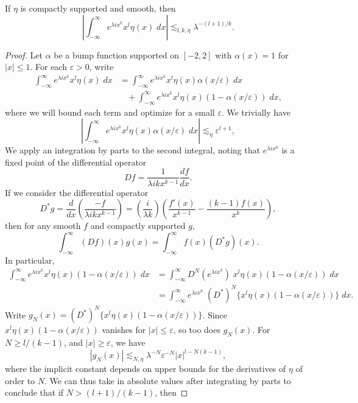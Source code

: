 \begin{lemma}
  If $\eta$ is compactly supported and smooth, then
  \[ \left| \int_{-\infty}^\infty e^{\lambda i x^k} x^l \eta(x)\; dx \right| \lesssim_{l,k,\eta} \lambda^{-(l + 1)/k}. \]
\end{lemma}
\begin{proof}
  Let $\alpha$ be a bump function supported on $[-2,2]$ with $\alpha(x) = 1$ for $|x| \leq 1$. For each $\varepsilon > 0$, write
  \begin{align*}
    \int_{-\infty}^\infty e^{\lambda i x^k} x^l \eta(x)\; dx &= \int_{-\infty}^\infty e^{\lambda i x^k} x^l \eta(x) \alpha(x/\varepsilon)\; dx\\
    &\ \ \ \ + \int_{-\infty}^\infty e^{\lambda i x^k} x^l \eta(x) (1 - \alpha(x/\varepsilon))\; dx,
  \end{align*}
  where we will bound each term and optimize for a small $\varepsilon$. We trivially have
  \[ \left| \int_{-\infty}^\infty e^{\lambda i x^k} x^l \eta(x) \alpha(x/\varepsilon)\; dx \right| \lesssim_\eta \varepsilon^{l+1}, \]
  We apply an integration by parts to the second integral, noting that $e^{\lambda i x^k}$ is a fixed point of the differential operator
  \[ Df = \frac{1}{\lambda i k x^{k-1}} \frac{df}{dx}. \]
  If we consider the differential operator
  \[ D^*g = \frac{d}{dx} \left( \frac{-f}{\lambda i k x^{k-1}} \right) = \left( \frac{i}{\lambda k} \right) \left( \frac{f'(x)}{x^{k-1}} - \frac{(k-1) f(x)}{x^k} \right), \]
  then for any smooth $f$ and compactly supported $g$,
  \[ \int_{-\infty}^\infty (Df)(x) g(x) = \int_{-\infty}^\infty f(x) (D^* g)(x). \]
  In particular,
  \begin{align*}
    \int_{-\infty}^\infty e^{\lambda i x^k} x^l \eta(x) (1 - \alpha(x/\varepsilon))\; dx &= \int_{-\infty}^\infty D^N(e^{\lambda i x^k})\; x^l \eta(x) (1 - \alpha(x/\varepsilon))\; dx\\
    &= \int_{-\infty}^\infty e^{\lambda i x^k}\; (D^*)^N \{ x^l \eta(x) (1 - \alpha(x/\varepsilon)) \}\; dx.
  \end{align*}
  Write $g_N(x) = (D^*)^N \{ x^l \eta(x) (1 - \alpha(x/\varepsilon)) \}$. Since $x^l \eta(x) (1 - \alpha(x/\varepsilon))$ vanishes for $|x| \leq \varepsilon$, so too does $g_N(x)$. For $N \geq l/(k-1)$, and $|x| \geq \varepsilon$, we have
  \[ |g_N(x)| \lesssim_{N,\eta} \lambda^{-N} \varepsilon^{-N} |x|^{l - N(k-1)}, \]
  where the implicit constant depends on upper bounds for the derivatives of $\eta$ of order to $N$. We can thus take in absolute values after integrating by parts to conclude that if $N > (l+1)/(k-1)$, then

\end{proof}
